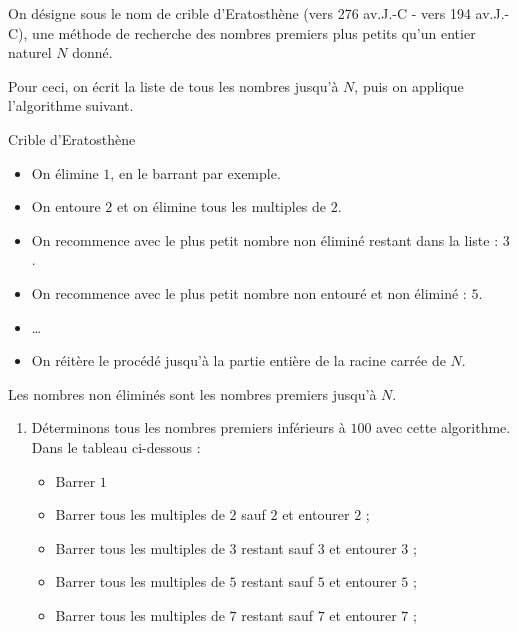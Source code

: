 \begin{exercice*}
    On désigne sous le nom de crible d'Eratosthène (vers 276 av.J.-C - vers 194 av.J.-C),
    une méthode de recherche des nombres premiers plus petits qu'un entier naturel $N$ donné.

    \smallskip
    Pour ceci, on écrit la liste de tous les nombres jusqu'à $N$, puis on applique l'algorithme suivant.

    \begin{myBox}{Crible d'Eratosthène}
        \begin{itemize}
            \item On élimine $1$, en le barrant par exemple.
            \item On entoure $2$ et on élimine tous les multiples de $2$.
            \item On recommence avec le plus petit nombre non éliminé restant dans la liste : $3$.
            \item On recommence avec le plus petit nombre non entouré et non éliminé : $5$.
            \item \dots
            \item On réitère le procédé jusqu'à la partie entière de la racine carrée de $N$.
        \end{itemize}
    \end{myBox}

    Les nombres non éliminés sont les nombres premiers jusqu'à $N$.    
    \begin{enumerate}
        \item Déterminons tous les nombres premiers inférieurs à $100$ avec cette algorithme. Dans le tableau ci-dessous :
        \begin{itemize}
            \item Barrer $1$
            \item Barrer tous les multiples de $2$ sauf $2$ et entourer $2$ ;
            \item Barrer tous les multiples de $3$ restant sauf $3$ et entourer $3$ ;
            \item Barrer tous les multiples de $5$ restant sauf $5$ et entourer $5$ ;
            \item Barrer tous les multiples de $7$ restant sauf $7$ et entourer $7$ ;
        \end{itemize}


\end{enumerate}
\end{exercice*}
